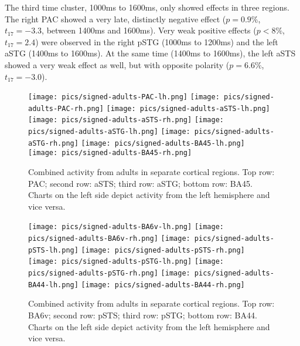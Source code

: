 The third time cluster, 1000ms to 1600ms, only showed effects in three regions.
The right PAC showed a very late, distinctly negative effect ($p = 0.9\%$, $t_{17} = -3.3$, between 1400ms and 1600ms).
Very weak positive effects ($p < 8\%$, $t_{17} = 2.4$) were observed in the right pSTG (1000ms to 1200ms) and the left aSTG (1400ms to 1600ms).
At the same time (1400ms to 1600ms), the left aSTS showed a very weak effect as well, but with opposite polarity ($p = 6.6\%$, $t_{17} = -3.0$).

\begin{figure}[h]
\begin{center}
\texttt{[image: pics/signed-adults-PAC-lh.png]}
\texttt{[image: pics/signed-adults-PAC-rh.png]}
\texttt{[image: pics/signed-adults-aSTS-lh.png]}
\texttt{[image: pics/signed-adults-aSTS-rh.png]}
\texttt{[image: pics/signed-adults-aSTG-lh.png]}
\texttt{[image: pics/signed-adults-aSTG-rh.png]}
\texttt{[image: pics/signed-adults-BA45-lh.png]}
\texttt{[image: pics/signed-adults-BA45-rh.png]}
\caption{\label{4.3.activity.adults.ventral} Combined activity from adults in separate cortical regions. Top row: PAC; second row: aSTS; third row: aSTG; bottom row: BA45. Charts on the left side depict activity from the left hemisphere and vice versa.}
\end{center}
\end{figure}


\begin{figure}[h]
\begin{center}
\texttt{[image: pics/signed-adults-BA6v-lh.png]}
\texttt{[image: pics/signed-adults-BA6v-rh.png]}
\texttt{[image: pics/signed-adults-pSTS-lh.png]}
\texttt{[image: pics/signed-adults-pSTS-rh.png]}
\texttt{[image: pics/signed-adults-pSTG-lh.png]}
\texttt{[image: pics/signed-adults-pSTG-rh.png]}
\texttt{[image: pics/signed-adults-BA44-lh.png]}
\texttt{[image: pics/signed-adults-BA44-rh.png]}
\caption{\label{4.3.activity.adults.ventral} Combined activity from adults in separate cortical regions. Top row: BA6v; second row: pSTS; third row: pSTG; bottom row: BA44. Charts on the left side depict activity from the left hemisphere and vice versa.}
\end{center}
\end{figure}


